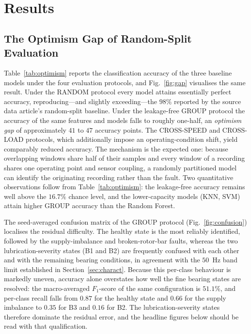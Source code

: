 \providecommand{\cmark}{\ding{51}}
\providecommand{\xmark}{\ding{55}}

\section{Results}
\label{sec:results}

\subsection{The Optimism Gap of Random-Split Evaluation}
\label{subsec:gap}
Table~\ref{tab:optimism} reports the classification accuracy of the three
baseline models under the four evaluation protocols, and Fig.~\ref{fig:gap}
visualises the same result. Under the RANDOM protocol every model attains
essentially perfect accuracy, reproducing---and slightly exceeding---the $98\%$
reported by the source data article's random-split baseline. Under the
leakage-free GROUP protocol the accuracy of the same features and models falls to
roughly one-half, an \emph{optimism gap} of approximately $41$ to $47$ accuracy
points.
The CROSS-SPEED and CROSS-LOAD protocols, which additionally impose an
operating-condition shift, yield comparably reduced accuracy. The mechanism is
the expected one: because overlapping windows share half of their samples and
every window of a recording shares one operating point and sensor coupling, a
randomly partitioned model can identify the originating recording rather than the
fault. Two quantitative observations follow from Table~\ref{tab:optimism}: the
leakage-free accuracy remains well above the $16.7\%$ chance level, and the
lower-capacity models (KNN, SVM) attain higher GROUP accuracy than the Random
Forest.

The seed-averaged confusion matrix of the GROUP protocol
(Fig.~\ref{fig:confusion}) localises the residual difficulty. The healthy state
is the most reliably identified, followed by the supply-imbalance and
broken-rotor-bar faults, whereas the two lubrication-severity states (B1 and B2)
are frequently confused with each other and with the remaining bearing
conditions, in agreement with the $50$~Hz band limit established in
Section~\ref{sec:charact}. Because this per-class behaviour is markedly uneven,
accuracy alone overstates how well the fine bearing states are resolved: the
macro-averaged $F_1$-score of the same configuration is $51.1\%$, and per-class
recall falls from $0.87$ for the healthy state and $0.66$ for the supply
imbalance to $0.35$ for B3 and $0.16$ for B2. The lubrication-severity states
therefore dominate the residual error, and the headline figures below should be
read with that qualification.

